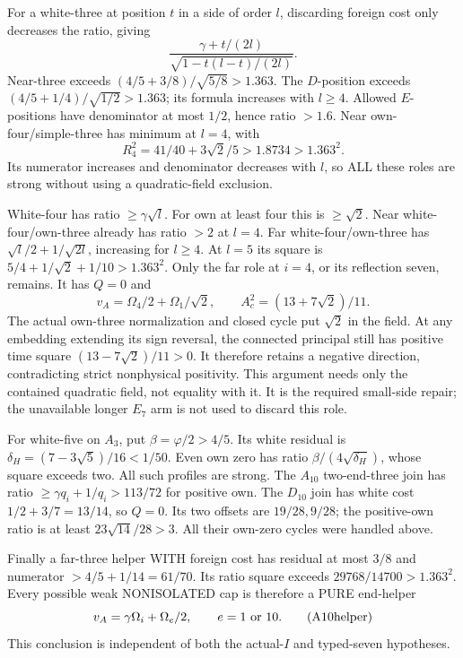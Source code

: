 \documentclass[11pt]{article}
\begin{document}
For a white-three at position \(t\) in a
side of order \(l\), discarding foreign
cost only decreases the ratio, giving
\[
                  {\frac{\gamma+t/(2l)}{\sqrt{1-t(l-t)/(2l)}}} .
\]
Near-three exceeds
\((4/5+3/8)/\sqrt{5/8}>1.363\).
The \(D\)-position exceeds
\((4/5+1/4)/\sqrt{1/2}>1.363\);
its formula increases with \(l\ge4\).
Allowed \(E\)-positions have denominator
at most \(1/2\), hence ratio \(>1.6\).
Near own-four/simple-three has minimum
at \(l=4\), with
\[
                     R_4^2=41/40+3\sqrt2/5
                             >1.8734>1.363^2 .
\]
Its numerator increases and denominator
decreases with \(l\), so ALL these roles
are strong without using a quadratic-field
exclusion.

White-four has ratio \(\ge\gamma\sqrt l\).
For own at least four this is \(\ge\sqrt2\).
Near white-four/own-three already has
ratio \(>2\) at \(l=4\).
Far white-four/own-three has
\(\sqrt l/2+1/\sqrt{2l}\), increasing for
\(l\ge4\).
At \(l=5\) its square is
\(5/4+1/\sqrt2+1/10>1.363^2\).
Only the far role at \(i=4\), or its
reflection seven, remains.
It has \(Q=0\) and
\[
 v_A=\Omega_4/2+\Omega_1/\sqrt2,\qquad
                   A_c^2=(13+7\sqrt2)/11 .
\]
The actual own-three normalization and
closed cycle put \(\sqrt2\) in the field.
At any embedding extending its sign reversal,
the connected principal still has positive
time square \((13-7\sqrt2)/11>0\).
It therefore retains a negative direction,
contradicting strict nonphysical positivity.
This argument needs only the contained
quadratic field, not equality with it.
It is the required small-side repair;
the unavailable longer \(E_7\) arm is not
used to discard this role.

For white-five on \(A_3\), put
\(\beta=\varphi/2>4/5\).
Its white residual is
\(\delta_H=(7-3\sqrt5)/16<1/50\).
Even own zero has ratio
\(\beta/(4\sqrt{\delta_H})\), whose square
exceeds two.  All such profiles are strong.
The \(A_{10}\) two-end-three join has ratio
\(\ge\gamma q_i+1/q_i>113/72\) for
positive own.
The \(D_{10}\) join has white cost
\(1/2+3/7=13/14\), so \(Q=0\).
Its two offsets are \(19/28,9/28\);
the positive-own ratio is at least
\(23\sqrt{14}/28>3\).
All their own-zero cycles were handled above.

Finally a far-three helper WITH foreign cost
has residual at most \(3/8\) and numerator
\(>4/5+1/14=61/70\).
Its ratio square exceeds
\(29768/14700>1.363^2\).
Every possible weak NONISOLATED cap is
therefore a PURE end-helper
\[
              v_A=\gamma\Omega_i+\Omega_e/2,
               \qquad e=1\ \hbox{or }10 .
\tag{A10helper}\label{eq:arithA10helper}
\]
This conclusion is independent of both
the actual-\(I\) and typed-seven hypotheses.
\end{document}
